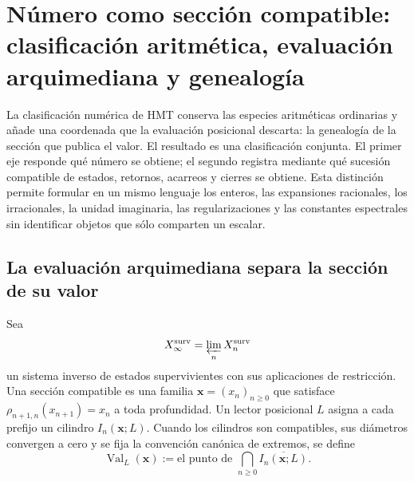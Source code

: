 \label{chap:p3-83-44-clasificacion_numero}









\section[N\'umero como secci\'on compatible]{N\'umero como secci\'on
compatible: clasificaci\'on aritm\'etica, evaluaci\'on arquimediana y
genealog\'ia}
\label{p3-83-c44-s1:sec:ontologia-numeros-rev11}

La clasificaci\'on num\'erica de HMT conserva las especies aritm\'eticas
ordinarias y a\~nade una coordenada que la evaluaci\'on posicional descarta: la
genealog\'ia de la secci\'on que publica el valor. El resultado es una
clasificaci\'on conjunta. El primer eje responde qu\'e n\'umero se obtiene; el
segundo registra mediante qu\'e sucesi\'on compatible de estados, retornos,
acarreos y cierres se obtiene. Esta distinci\'on permite formular en un mismo
lenguaje los enteros, las expansiones racionales, los irracionales, la unidad
imaginaria, las regularizaciones y las constantes espectrales sin identificar
objetos que s\'olo comparten un escalar.

\subsection{La evaluaci\'on arquimediana separa la secci\'on de su valor}

Sea
\[
 X_{\infty}^{\rm surv}
 =\varprojlim_n X_n^{\rm surv}
\]
un sistema inverso de estados supervivientes con sus aplicaciones de
restricci\'on. Una secci\'on compatible es una familia
\(\boldsymbol x=(x_n)_{n\geq0}\) que satisface
\(\rho_{n+1,n}(x_{n+1})=x_n\) a toda profundidad. Un lector posicional
\(L\) asigna a cada prefijo un cilindro \(I_n(\boldsymbol x;L)\). Cuando los
cilindros son compatibles, sus di\'ametros convergen a cero y se fija la
convenci\'on can\'onica de extremos, se define
\begin{equation}
 \operatorname{Val}_{L}(\boldsymbol x)
 :=\text{el punto de }
 \bigcap_{n\geq0}\overline{I_n(\boldsymbol x;L)}.
 \label{p3-83-c44-s1:eq:valor-lector-seccion-rev11}
\end{equation}

